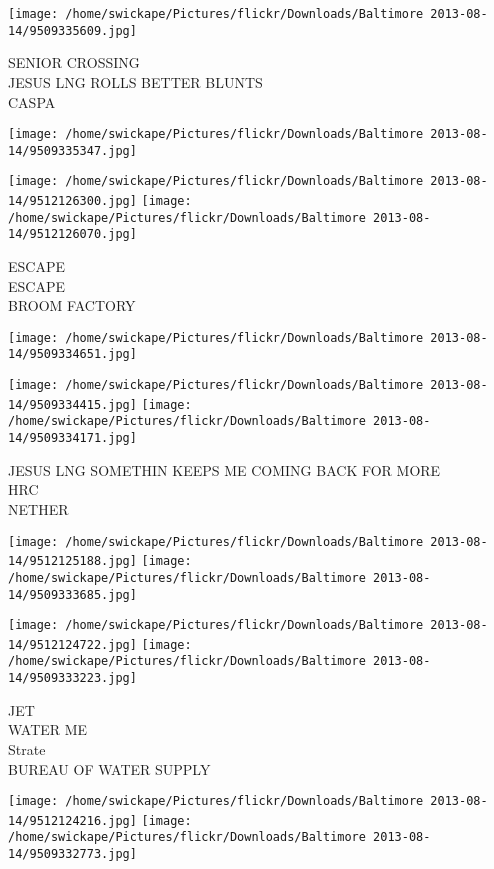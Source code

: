 \documentclass[10pt,letterpaper]{article}
\begin{document}
\texttt{[image: /home/swickape/Pictures/flickr/Downloads/Baltimore 2013-08-14/9509335609.jpg]}

SENIOR CROSSING\\
JESUS LNG ROLLS BETTER BLUNTS\\
CASPA
\pagebreak

\texttt{[image: /home/swickape/Pictures/flickr/Downloads/Baltimore 2013-08-14/9509335347.jpg]}

\vspace{0.25in}
\texttt{[image: /home/swickape/Pictures/flickr/Downloads/Baltimore 2013-08-14/9512126300.jpg]}
\texttt{[image: /home/swickape/Pictures/flickr/Downloads/Baltimore 2013-08-14/9512126070.jpg]}

ESCAPE\\
ESCAPE\\
BROOM FACTORY
\pagebreak

\texttt{[image: /home/swickape/Pictures/flickr/Downloads/Baltimore 2013-08-14/9509334651.jpg]}

\vspace{0.25in}
\texttt{[image: /home/swickape/Pictures/flickr/Downloads/Baltimore 2013-08-14/9509334415.jpg]}
\texttt{[image: /home/swickape/Pictures/flickr/Downloads/Baltimore 2013-08-14/9509334171.jpg]}

JESUS LNG SOMETHIN KEEPS ME COMING BACK FOR MORE\\
HRC\\
NETHER
\pagebreak

\texttt{[image: /home/swickape/Pictures/flickr/Downloads/Baltimore 2013-08-14/9512125188.jpg]}
\texttt{[image: /home/swickape/Pictures/flickr/Downloads/Baltimore 2013-08-14/9509333685.jpg]}

\texttt{[image: /home/swickape/Pictures/flickr/Downloads/Baltimore 2013-08-14/9512124722.jpg]}
\texttt{[image: /home/swickape/Pictures/flickr/Downloads/Baltimore 2013-08-14/9509333223.jpg]}

JET\\
WATER ME\\
Strate\\
BUREAU OF WATER SUPPLY
\pagebreak

\texttt{[image: /home/swickape/Pictures/flickr/Downloads/Baltimore 2013-08-14/9512124216.jpg]}
\texttt{[image: /home/swickape/Pictures/flickr/Downloads/Baltimore 2013-08-14/9509332773.jpg]}
\end{document}
